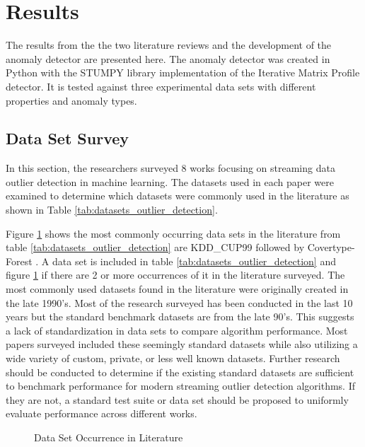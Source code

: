 \section{Results}
\label{ref_results}

The results from the the two literature reviews and the development of the anomaly detector are presented here. The anomaly detector was created in Python with the STUMPY library implementation of the Iterative Matrix Profile detector. It is tested against three experimental data sets with different properties and anomaly types. 

\subsection{Data Set Survey}
In this section, the researchers surveyed 8 works focusing on streaming data outlier detection in machine learning. The datasets used in each paper were examined to determine which datasets were commonly used in the literature as shown in Table \ref{tab:datasets_outlier_detection}. 



Figure \ref{fig_dataset_lit} shows the most commonly occurring data sets in the literature from table \ref{tab:datasets_outlier_detection} are KDD\_CUP99 \parencite{kdd1999} followed by Covertype-Forest \parencite{covertype-dataset}. A data set is included in table \ref{tab:datasets_outlier_detection} and figure \ref{fig_dataset_lit} if there are 2 or more occurrences of it in the literature surveyed. The most commonly used datasets found in the literature were originally created in the late 1990's. Most of the research surveyed has been conducted in the last 10 years but the standard benchmark datasets are from the late 90's. This suggests a lack of standardization in data sets to compare algorithm performance. Most papers surveyed included these seemingly standard datasets while also utilizing a wide variety of custom, private, or less well known datasets. Further research should be conducted to determine if the existing standard datasets are sufficient to benchmark performance for modern streaming outlier detection algorithms. If they are not, a standard test suite or data set should be proposed to uniformly evaluate performance across different works.

\begin{figure}[H]
    \caption{Data Set Occurrence in Literature }
    \label{fig_dataset_lit}
\end{figure}

